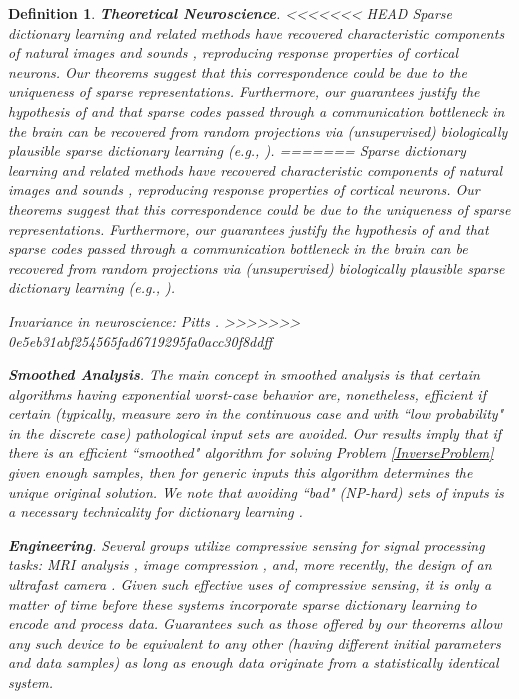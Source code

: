 \documentclass[9pt,twocolumn]{pnas-new}
\newtheorem{definition}{Definition}
\begin{document}
\begin{definition}
\textbf{Theoretical Neuroscience}.
<<<<<<< HEAD
Sparse dictionary learning and related methods have recovered characteristic components of natural images \cite{Olshausen96, hurri1996image, bell1997independent, van1998independent} and sounds \cite{bellsejnowski1996, smithlewicki2006, Carlson12}, reproducing response properties of cortical neurons. Our theorems suggest that this correspondence could be due to the uniqueness of sparse representations. Furthermore, our guarantees justify the hypothesis of \cite{Coulter10} and \cite{Isely10} that sparse codes passed through a communication bottleneck in the brain can be recovered from random projections via (unsupervised) biologically plausible sparse dictionary learning (e.g., \cite{rozell2007neurally, hu2014hebbian}).   
=======
Sparse dictionary learning and related methods have recovered characteristic components of natural images \cite{Olshausen96, hurri1996image, bell1997independent, van1998independent} and sounds \cite{bellsejnowski1996, smithlewicki2006, Carlson12}, reproducing response properties of cortical neurons. Our theorems suggest that this correspondence could be due to the uniqueness of sparse representations. Furthermore, our guarantees justify the hypothesis of \cite{Coulter10} and \cite{Isely10} that sparse codes passed through a communication bottleneck in the brain can be recovered from random projections via (unsupervised) biologically plausible sparse dictionary learning (e.g., \cite{rehnsommer2007, rozell2007neurally, hu2014hebbian}).   

Invariance in neuroscience: Pitts \cite{pitts1947}.
>>>>>>> 0e5eb31abf254565fad6719295fa0acc30f8ddff

\textbf{Smoothed Analysis}.
The main concept in smoothed analysis \cite{Spielman04} is that certain algorithms having exponential worst-case behavior are, nonetheless, efficient if certain (typically, measure zero in the continuous case and with ``low probability" in the discrete case) pathological input sets are avoided. Our results imply that if there is an efficient ``smoothed" algorithm for solving Problem \ref{InverseProblem} given enough samples, then for generic inputs this algorithm determines the unique original solution. We note that avoiding ``bad" (NP-hard) sets of inputs is a necessary technicality for dictionary learning \cite{Razaviyayn15, Tillmann15}.

\textbf{Engineering}.
Several groups utilize compressive sensing for signal processing tasks: MRI analysis \cite{lustig2008compressed},  image compression \cite{Duarte08}, and, more recently, the design of an ultrafast camera \cite{Gao14}. Given such effective uses of compressive sensing, it is only a matter of time before these systems incorporate sparse dictionary learning to encode and process data. Guarantees such as those offered by our theorems allow any such device to be equivalent to any other (having different initial parameters and data samples) as long as enough data originate from a statistically identical system.



\end{definition}
\end{document}
